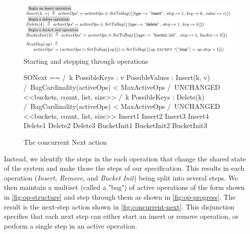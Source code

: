 \documentclass{uit-thesis}
\begin{document}
\begin{figure}
    \includegraphics[width=\textwidth]{SOConcurrent_steps.png}
    \caption{Starting and stepping through operations}
    \label{fig:op-progress}
\end{figure}
\begin{figure}
    \begin{tla}
SONext ==
    \/  /\ \E k \in PossibleKeys :
             \E v \in PossibleValues :
                Insert(k, v)
        /\ BagCardinality(activeOps) < MaxActiveOps
        /\ UNCHANGED <<buckets, count, list, size>>
    \/  /\ \E k \in PossibleKeys :
            Delete(k)
        /\ BagCardinality(activeOps) < MaxActiveOps
        /\ UNCHANGED <<buckets, count, list, size>>
    \/ Insert1
    \/ Insert2
    \/ Insert3
    \/ Insert4
    \/ Delete1
    \/ Delete2
    \/ Delete3
    \/ BucketInit1
    \/ BucketInit2
    \/ BucketInit3
    \end{tla}
\begin{tlatex}
%
%
%
%
%
%
%
%
%
%
%
%
%
%
%
%
%
%
\end{tlatex}
    \caption{The concurrent Next action}
    \label{fig:concurrent-next}
\end{figure}
Instead, we identify the steps in the each operation that change the shared state of the system and make those the steps of our specification. This results in each operation (\textit{Insert, Remove}, and \textit{Bucket Init}) being split into several steps. We then maintain a multiset (called a "bag") of active operations of the form shown in \autoref{fig:op-structure} and step through them as shown in \autoref{fig:op-progress}. The result is the next-step action shown in \autoref{fig:concurrent-next}. This disjunction specifies that each next step can either start an insert or remove operation, or perform a single step in an active operation.
\end{document}
